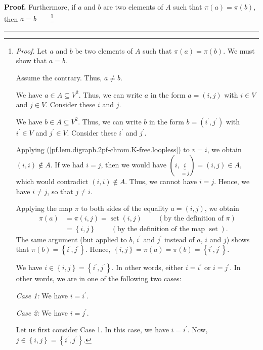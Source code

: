 \documentclass[numbers=enddot,12pt,final,onecolumn,notitlepage]{scrartcl}%
\theoremstyle{definition}
\newenvironment{proof}[1][Proof]{\noindent\textbf{#1.} }{\ \rule{0.5em}{0.5em}}
\newenvironment{verlong}{}{}
\begin{document}
\begin{verlong}
\begin{proof}
Furthermore, if $a$ and $b$ are two elements of $A$ such that $\pi\left(
a\right)  =\pi\left(  b\right)  $, then $a=b$\ \ \ \ \footnote{\textit{Proof.}
Let $a$ and $b$ be two elements of $A$ such that $\pi\left(  a\right)
=\pi\left(  b\right)  $. We must show that $a=b$.
\par
Assume the contrary. Thus, $a\neq b$.
\par
We have $a\in A\subseteq V^{2}$. Thus, we can write $a$ in the form $a=\left(
i,j\right)  $ with $i\in V$ and $j\in V$. Consider these $i$ and $j$.
\par
We have $b\in A\subseteq V^{2}$. Thus, we can write $b$ in the form $b=\left(
i^{\prime},j^{\prime}\right)  $ with $i^{\prime}\in V$ and $j^{\prime}\in V$.
Consider these $i^{\prime}$ and $j^{\prime}$.
\par
Applying (\ref{pf.lem.digraph.2pf-chrom.K-free.loopless}) to $v=i$, we obtain
$\left(  i,i\right)  \notin A$. If we had $i=j$, then we would have $\left(
i,\underbrace{i}_{=j}\right)  =\left(  i,j\right)  \in A$, which would
contradict $\left(  i,i\right)  \notin A$. Thus, we cannot have $i=j$. Hence,
we have $i\neq j$, so that $j\neq i$.
\par
Applying the map $\pi$ to both sides of the equality $a=\left(  i,j\right)  $,
we obtain
\begin{align*}
\pi\left(  a\right)   &  =\pi\left(  i,j\right)  =\operatorname*{set}\left(
i,j\right)  \ \ \ \ \ \ \ \ \ \ \left(  \text{by the definition of }\pi\right)
\\
&  =\left\{  i,j\right\}  \ \ \ \ \ \ \ \ \ \ \left(  \text{by the definition
of the map }\operatorname*{set}\right)  .
\end{align*}
The same argument (but applied to $b$, $i^{\prime}$ and $j^{\prime}$ instead
of $a$, $i$ and $j$) shows that $\pi\left(  b\right)  =\left\{  i^{\prime
},j^{\prime}\right\}  $. Hence, $\left\{  i,j\right\}  =\pi\left(  a\right)
=\pi\left(  b\right)  =\left\{  i^{\prime},j^{\prime}\right\}  $.
\par
We have $i\in\left\{  i,j\right\}  =\left\{  i^{\prime},j^{\prime}\right\}  $.
In other words, either $i=i^{\prime}$ or $i=j^{\prime}$. In other words, we
are in one of the following two cases:
\par
\textit{Case 1:} We have $i=i^{\prime}$.
\par
\textit{Case 2:} We have $i=j^{\prime}$.
\par
Let us first consider Case 1. In this case, we have $i=i^{\prime}$. Now,
$j\in\left\{  i,j\right\}  =\left\{  i^{\prime},j^{\prime}\right\}  $.
}
\end{proof}
\end{verlong}
\end{document}
